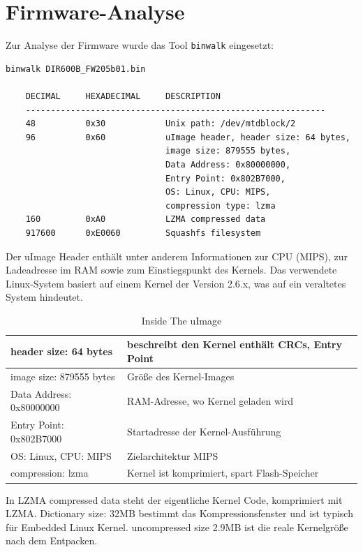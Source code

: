 	\section{Firmware-Analyse}
	\label{sec:Firmware-Analyse}
	Zur Analyse der Firmware wurde das Tool \texttt{binwalk} eingesetzt:

	\begin{lstlisting}[basicstyle=\ttfamily,
		columns=fullflexible,
    	keepspaces=true,
    	breaklines=true
		]
	binwalk DIR600B_FW205b01.bin 
	
	DECIMAL     HEXADECIMAL  	DESCRIPTION
	------------------------------------------------------------
	48          0x30        	Unix path: /dev/mtdblock/2
	96          0x60           	uImage header, header size: 64 bytes,
								image size: 879555 bytes,
								Data Address: 0x80000000,
								Entry Point: 0x802B7000,
								OS: Linux, CPU: MIPS,
								compression type: lzma
	160         0xA0           	LZMA compressed data
	917600      0xE0060        	Squashfs filesystem
	\end{lstlisting}
	
	Der uImage Header enthält unter anderem Informationen zur CPU (MIPS), zur Ladeadresse im RAM sowie zum Einstiegspunkt
	des Kernels. Das verwendete Linux-System basiert auf einem Kernel der Version 2.6.x, was auf ein
	veraltetes System hindeutet.

	\begin{table}[h]
		\centering
		\hypertarget{tabelle1}{}
			\begin{tabularx}{\columnwidth}{|X|X|}
			\hline
			header size: 64 bytes & beschreibt den Kernel \newline enthält CRCs, Entry Point \\
			\hline
			image size: 879555 bytes & Größe des Kernel-Images \\
			\hline
			Data Address: 0x80000000 & RAM-Adresse, wo Kernel geladen wird \\
			\hline
			Entry Point: 0x802B7000 & Startadresse der Kernel-Ausführung \\
			\hline
			OS: Linux, CPU: MIPS & Zielarchitektur MIPS \\
			\hline
			compression: lzma & Kernel ist komprimiert, spart Flash-Speicher \\
			\hline
			\end{tabularx}
		\caption{Inside The uImage}
	\end{table}
	
	In LZMA compressed data steht der eigentliche Kernel Code, komprimiert mit LZMA.
	Dictionary size: 32MB bestimmt das Kompressionsfenster und ist typisch für Embedded Linux Kernel.
	uncompressed size 2.9MB ist die reale Kernelgröße nach dem Entpacken.


